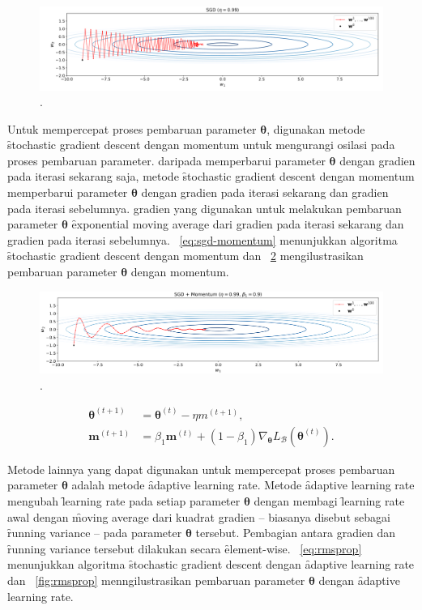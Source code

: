 \begin{figure}
    \centering
    \includegraphics[width=1\textwidth]{assets/pics/learning-rate-good.png}
    \caption{\license.}
    \label{fig:learning-rate-good}
\end{figure}

Untuk mempercepat proses pembaruan parameter $\bm{\theta}$, digunakan metode \f{stochastic gradient descent} dengan momentum untuk mengurangi osilasi pada proses pembaruan parameter. daripada memperbarui parameter $\bm{\theta}$ dengan gradien pada iterasi sekarang saja, metode \f{stochastic gradient descent} dengan momentum memperbarui parameter $\bm{\theta}$ dengan gradien pada iterasi sekarang dan gradien pada iterasi sebelumnya. gradien yang digunakan untuk melakukan pembaruan parameter $\bm{\theta}$ \f{exponential moving average} dari gradien pada iterasi sekarang dan gradien pada iterasi sebelumnya. \equ~\ref{eq:sgd-momentum} menunjukkan algoritma \f{stochastic gradient descent} dengan momentum dan \pic~\ref{fig:sgd-momentum} mengilustrasikan pembaruan parameter $\bm{\theta}$ dengan momentum.

\begin{figure}
    \centering
    \includegraphics[width=1\textwidth]{assets/pics/sgd-momentum.png}
    \caption{\license.}
    \label{fig:sgd-momentum}
\end{figure}

\begin{align}
    \label{eq:sgd-momentum}
    \bm{\theta}^{(t+1)} &= \bm{\theta}^{(t)} - \eta m^{(t+1)}, \\
    \bm{m}^{(t+1)} &= \beta_1 \bm{m}^{(t)} + (1 - \beta_1) \nabla_{\bm{\theta}} L_{\mathcal{B}}(\bm{\theta}^{(t)}).
\end{align}


Metode lainnya yang dapat digunakan untuk mempercepat proses pembaruan parameter $\bm{\theta}$ adalah metode \f{adaptive learning rate}. Metode \f{adaptive learning rate} mengubah \f{learning rate} pada setiap parameter $\bm{\theta}$ dengan membagi \f{learning rate} awal dengan \f{moving average} dari kuadrat gradien -- biasanya disebut sebagai \f{running variance} -- pada parameter $\bm{\theta}$ tersebut. Pembagian antara gradien dan \f{running variance} tersebut dilakukan secara \f{element-wise}. \equ~\ref{eq:rmsprop} menunjukkan algoritma \f{stochastic gradient descent} dengan \f{adaptive learning rate} dan \pic~\ref{fig:rmsprop} menngilustrasikan pembaruan parameter $\bm{\theta}$ dengan \f{adaptive learning rate}.


